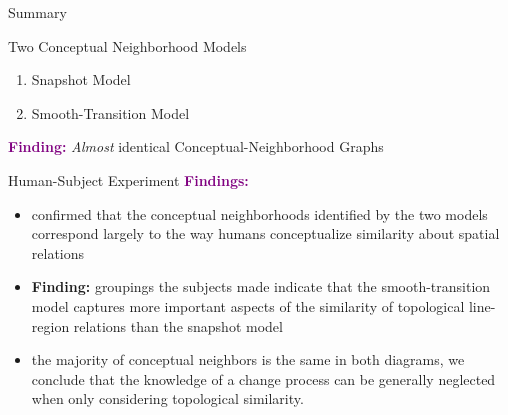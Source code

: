 
\begin{frame}{Summary}
	\begin{block}{ Two Conceptual Neighborhood Models}
		
		
		\begin{enumerate}
			\item Snapshot Model
			
			\item Smooth-Transition Model
		\end{enumerate}
		\textcolor{purple}{\textbf{Finding:}} \textit{Almost} identical Conceptual-Neighborhood Graphs
	\end{block}
	\vspace{6pt}
	\begin{block}{Human-Subject Experiment}
		\textcolor{purple}{\textbf{Findings:}}
		\begin{itemize}
			\item confirmed that the conceptual neighborhoods identified by the two models correspond largely to the way humans conceptualize similarity about spatial relations
			\item \textbf{Finding:} groupings the subjects made indicate that the smooth-transition model captures more important aspects of the similarity of topological line-region relations than the snapshot model
			
			\item the majority of conceptual neighbors is the same in both diagrams, we conclude that the knowledge of a change process can be generally neglected when only considering topological similarity.
		\end{itemize}
	\end{block}
\end{frame}

\begin{comment}
The smooth-transition model represented the change process explicitly, whereas the snapshot model inferred change from topological differences.
\end{comment}
